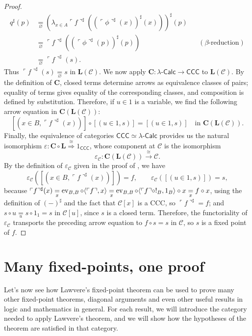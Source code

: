 \begin{proof}
\begin{align*}
        q^\sharp(p) &\underset{\varnothing}{=} (\lambda_{x \in A}\ulcorner f \urcorner^\sharp ((\ulcorner \phi \urcorner^\sharp(x))^\sharp(x)))^\sharp(p) \\
                    &\underset{\varnothing}{=} \ulcorner f \urcorner^\sharp((\ulcorner \phi \urcorner^\sharp(p))^\sharp(p)) &&(\text{$\beta$-reduction}) \\
                    &\underset{\varnothing}{=} \ulcorner f \urcorner^\sharp(s).
    \end{align*}
    Thus $\ulcorner f \urcorner^\sharp(s) \underset{\varnothing}{=} s$ in $\mathbf L(\mathcal C)$. We now apply $\mathbf C : \lambda\text{-}\mathsf{Calc} \to \mathsf{CCC}$ to $\mathbf L(\mathcal C)$. By the definition of $\mathbf C$, closed terms determine arrows as equivalence classes of pairs; equality of terms gives equality of the corresponding classes, and composition is defined by substitution.
    Therefore, if $u \in 1$ is a variable, we find the following arrow equation in $\mathbf C(\mathbf L(\mathcal C))$:
    \[ [(x \in B,\ulcorner f \urcorner^\sharp(x))] \circ [(u \in 1,s)] = [(u \in 1,s)] \quad\text{in } \mathbf C(\mathbf L(\mathcal C)). \]
    Finally, the equivalence of categories $\mathsf{CCC} \simeq \lambda\text{-}\mathsf{Calc}$ provides us the natural isomorphism $\varepsilon : \mathbf C \circ \mathbf L \overset{\cong}{\Rightarrow }1_{\mathsf{CCC}}$,
    whose component at $\mathcal C$ is the isomorphism
    \[ \varepsilon_{\mathcal C} : \mathbf C(\mathbf L(\mathcal C)) \xrightarrow{\cong} \mathcal C. \]
    By the definition of $\varepsilon_{\mathcal C}$ given in the proof of , we have
    \[ \varepsilon_{\mathcal C}([(x \in B,\ulcorner f \urcorner^\sharp(x))]) = f, \qquad \varepsilon_{\mathcal C}([(u \in 1,s)]) = s, \]
    because $\ulcorner f \urcorner^\sharp(x) \underset{x}{=} \operatorname{ev}_{B,B} \circ \langle \ulcorner f \urcorner, x \rangle \underset{x}{=} \operatorname{ev}_{B,B} \circ \langle \ulcorner f \urcorner \circ !_B, 1_B \rangle \circ x \underset{x}{=} f \circ x$, using the definition of $(-)^\sharp$
    and the fact that $\mathcal C[x]$ is a CCC, so $\ulcorner f \urcorner^\sharp = f$; and $s \circ u \underset{u}{=} s \circ 1_1 = s$ in $\mathcal C[u]$, since $s$ is a closed term.
    Therefore, the functoriality of $\varepsilon_{\mathcal C}$ transports the preceding arrow equation to $f \circ s=s$ in $\mathcal C$, so $s$ is a fixed point of $f$.
\end{proof}

\section{Many fixed-points, one proof}\label{sec:many-fixed-points-one-proof}
Let's now see how Lawvere's fixed-point theorem can be used to prove many other fixed-point theorems, diagonal arguments and even other useful results in logic and mathematics in general.
For each result, we will introduce the category needed to apply Lawvere's theorem, and we will show how the hypotheses of the theorem are satisfied in that category.

